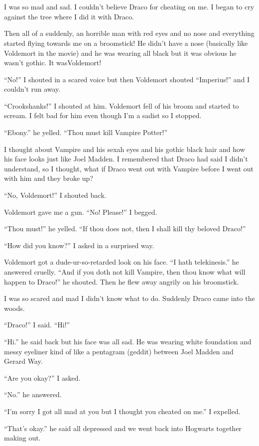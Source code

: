 \section{\chaptername~\thesection}



I was so mad and sad. I couldn't believe Draco for cheating on me. I began to cry against the tree where I did it with Draco.

Then all of a suddenly, an horrible man with red eyes and no nose and everything started flying towards me on a broomstick! He didn't have a nose (basically like Voldemort in the movie) and he was wearing all black but it was obvious he wasn't gothic. It was\dotfill Voldemort!

\enquote{No!} I shouted in a scared voice but then Voldemort shouted \enquote{Imperius!} and I couldn't run away.

\enquote{Crookshanks!} I shouted at him. Voldemort fell of his broom and started to scream. I felt bad for him even though I'm a sadist so I stopped.

\enquote{Ebony.} he yelled. \enquote{Thou must kill Vampire Potter!}

I thought about Vampire and his sexah eyes and his gothic black hair and how his face looks just like Joel Madden. I remembered that Draco had said I didn't understand, so I thought, what if Draco went out with Vampire before I went out with him and they broke up?

\enquote{No, Voldemort!} I shouted back.

Voldemort gave me a gun. \enquote{No! Please!} I begged.

\enquote{Thou must!} he yelled. \enquote{If thou does not, then I shall kill thy beloved Draco!}

\enquote{How did you know?} I asked in a surprised way.

Voldemort got a dude-ur-so-retarded look on his face. \enquote{I hath telekinesis.} he answered cruelly. \enquote{And if you doth not kill Vampire, then thou know what will happen to Draco!} he shouted. Then he flew away angrily on his broomstick.

I was so scared and mad I didn't know what to do. Suddenly Draco came into the woods.

\enquote{Draco!} I said. \enquote{Hi!}

\enquote{Hi.} he said back but his face was all sad. He was wearing white foundation and messy eyeliner kind of like a pentagram (geddit) between Joel Madden and Gerard Way.

\enquote{Are you okay?} I asked.

\enquote{No.} he answered.

\enquote{I'm sorry I got all mad at you but I thought you cheated on me.} I expelled.

\enquote{That's okay.} he said all depressed and we went back into Hogwarts together making out.
